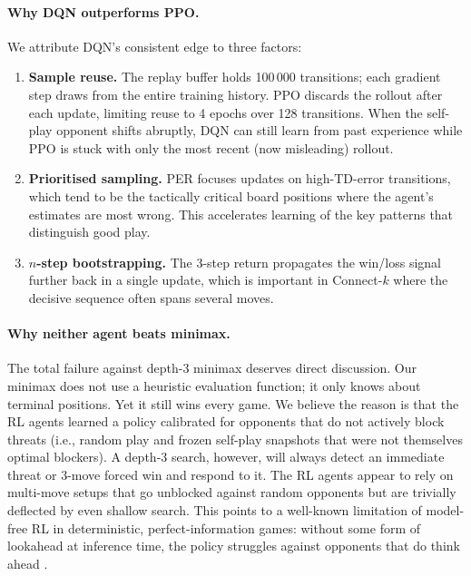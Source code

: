 \documentclass[10pt, letterpaper, twocolumn]{article}
\begin{document}
\paragraph{Why DQN outperforms PPO.}
We attribute DQN's consistent edge to three factors:
\begin{enumerate}
  \item \textbf{Sample reuse.}  The replay buffer holds 100\,000
  transitions; each gradient step draws from the entire training history.
  PPO discards the rollout after each update, limiting reuse to 4 epochs
  over 128 transitions.  When the self-play opponent shifts abruptly, DQN
  can still learn from past experience while PPO is stuck with only the
  most recent (now misleading) rollout.
  \item \textbf{Prioritised sampling.}  PER focuses updates on
  high-TD-error transitions, which tend to be the tactically critical
  board positions where the agent's estimates are most wrong.  This
  accelerates learning of the key patterns that distinguish good play.
  \item \textbf{$n$-step bootstrapping.}  The 3-step return propagates
  the win/loss signal further back in a single update, which is important
  in Connect-$k$ where the decisive sequence often spans several moves.
\end{enumerate}

\paragraph{Why neither agent beats minimax.}
The total failure against depth-3 minimax deserves direct discussion.
Our minimax does not use a heuristic evaluation function; it only knows
about terminal positions.  Yet it still wins every game.  We believe the
reason is that the RL agents learned a policy calibrated for opponents
that do not actively block threats (i.e., random play and frozen
self-play snapshots that were not themselves optimal blockers).  A
depth-3 search, however, will always detect an immediate threat or
3-move forced win and respond to it.  The RL agents appear to rely on
multi-move setups that go unblocked against random opponents but are
trivially deflected by even shallow search.  This points to a well-known
limitation of model-free RL in deterministic, perfect-information games:
without some form of lookahead at inference time, the policy struggles
against opponents that do think ahead \citep{silver2016alphago,
silver2018alphazero}.
\end{document}
